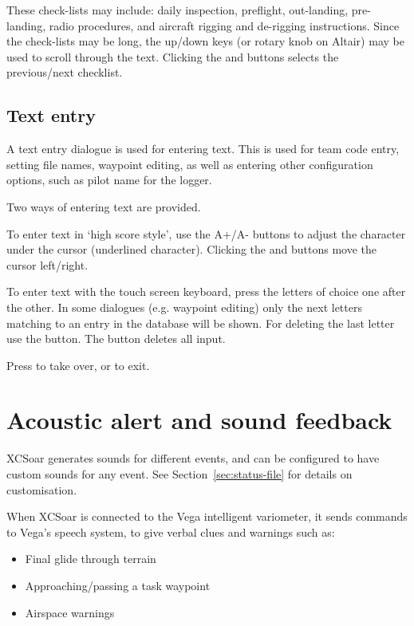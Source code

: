These check-lists may include: daily inspection, preflight, out-landing,
pre-landing, radio procedures, and aircraft rigging and de-rigging
instructions.  Since the check-lists may be long, the up/down keys (or rotary
knob on Altair) may be used to scroll through the text. Clicking the
\button{$<$} and \button{$>$} buttons selects the previous/next checklist.


\subsection*{Text entry} \label{sec:textentry}

A text entry dialogue is used for entering text.  This is used for team
code entry, setting file names, waypoint editing, as well as entering
other configuration options, such as pilot name for the logger.

Two ways of entering text are provided. 

To enter text in `high score style', use the A+/A- buttons to adjust the 
character under the cursor (underlined character). Clicking the \button{$<$} 
and \button{$>$} buttons move the cursor left/right.  

To enter text with the touch screen keyboard, press the letters of choice 
one after the other. In some dialogues (e.g. waypoint editing) only the next 
letters matching to an entry in the database will be shown. For deleting the 
last letter use the \button{$<-$} button. The  button deletes all input.

Press  to take over, or  to exit.


\section{Acoustic alert and sound feedback}

XCSoar generates sounds for different events, and can be configured to
have custom sounds for any event.  See Section~\ref{sec:status-file} for
details on customisation.

When XCSoar is connected to the Vega intelligent variometer, it sends
commands to Vega's speech system, to give verbal clues and warnings such as:
\begin{itemize}
\item Final glide through terrain
\item Approaching/passing a task waypoint
\item Airspace warnings
\end{itemize}

